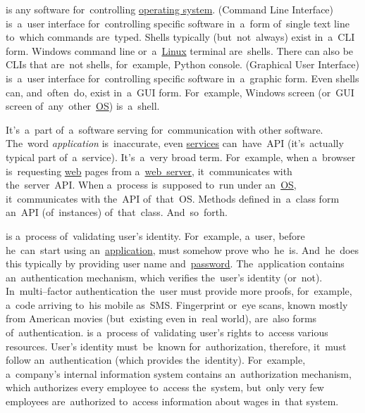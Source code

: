 \label{shellcligui}
\begin{itemize}
     is any software for~controlling \hyperref[os]{operating system}.
     (Command Line Interface) is~a~user interface for~controlling specific software in~a~form of~single text line to~which commands are~typed.
            Shells typically (but~not~always) exist in~a~CLI form.
            Windows command line or~a~\hyperref[linux]{Linux} terminal are~shells.
            There can also be CLIs that are~not shells, for~example, Python console.
     (Graphical User Interface) is~a~user interface for~controlling specific software in~a~graphic form.
            Even shells can, and~often~do, exist in~a~GUI form.
            For~example, Windows screen (or~GUI screen of~any~other~\hyperref[os]{OS}) is~a~shell.
\end{itemize}

\label{api}
It's~a~part of~a~software serving for~communication with other software.
The~word \textit{application} is~inaccurate, even \hyperref[applicationprocessprogramservicethread]{services} can~have~API (it's~actually typical part of~a~service).
It's~a~very broad term.
For~example, when a~browser is~requesting \hyperref[internetweb]{web} pages from a~\hyperref[webserver]{web~server}, it~communicates with the~server~API\@.
When a~process is~supposed to~run under an~\hyperref[os]{OS}, it~communicates with the~API of~that~OS\@.
Methods defined in~a~class form an~API (of~instances) of~that~class.
And~so~forth.

\label{authenticationauthorization}
\begin{itemize}
     is a~process of~validating user's identity.
            For~example, a~user, before he~can~start using an~\hyperref[applicationprocessprogramservicethread]{application}, must somehow prove who~he~is.
            And~he~does this typically by providing user name and~\hyperref[keypassword]{password}.
            The~application contains an~authentication mechanism, which verifies the~user's identity (or~not).
            In~multi--factor authentication the~user must provide more proofs, for~example, a~code arriving to~his mobile as~SMS.
            Fingerprint or~eye scans, known mostly from American movies (but~existing even in~real world), are~also forms of~authentication.
     is a~process of~validating user's rights to~access various resources.
            User's identity must~be~known for~authorization, therefore, it~must follow an~authentication (which provides the~identity).
            For~example, a~company's internal information system contains an~authorization mechanism, which authorizes every employee to~access the~system, but~only very few employees are~authorized to~access information about wages in~that system.
\end{itemize}
